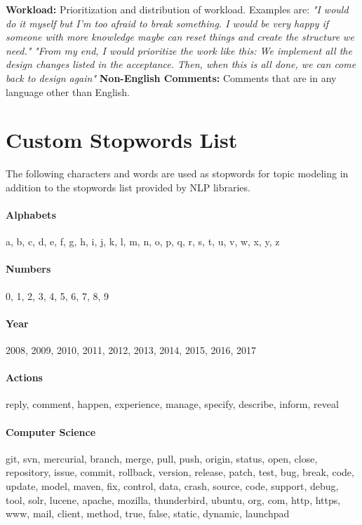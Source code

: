 \documentclass[a4paper,12pt,twoside]{report}
\begin{document}
\begin{appendices}
\textbf{Workload:} Prioritization and distribution of workload. Examples are:
\newline \newline 
\textit{"I would do it myself but I’m too afraid to break something. I would be very happy if someone with more knowledge maybe can reset things and create the structure we need."}
\newline \newline 
\textit{"From my end, I would prioritize the work like this: We implement all the design changes listed in the acceptance. Then, when this is all done, we can come back to design again"}
\newline \newline 
\textbf{Non-English Comments:} Comments that are in any language other than English. 

\chapter{Custom Stopwords List}
The following characters and words are used as stopwords for topic modeling in addition to the stopwords list provided by \acs{NLP} libraries. 

\subsubsection{Alphabets}
a, b, c, d, e, f, g, h, i, j, k, l, m, n, o, p, q, r, s, t, u, v, w, x, y, z

\subsubsection{Numbers}
0, 1, 2, 3, 4, 5, 6, 7, 8, 9

\subsubsection{Year}
2008, 2009, 2010, 2011, 2012, 2013, 2014, 2015, 2016, 2017

\subsubsection{Actions}
reply, comment, happen, experience, manage, specify, describe, inform, reveal

\subsubsection{Computer Science}
git, svn, mercurial, branch, merge, pull, push, origin, status, open, close, repository, issue, commit, rollback, version, release, patch, test, bug, break, code, update, model, maven, fix, control, data, crash, source, code, support, debug, tool, solr, lucene, apache, mozilla, thunderbird, ubuntu, org, com, http, https, www, mail, client, method, true, false, static, dynamic, launchpad

\end{appendices}
\clearpage


\listoffigures
\clearpage

\listoftables
\clearpage



\end{document}
